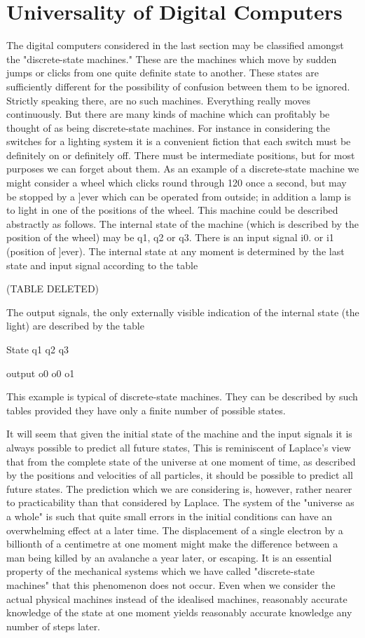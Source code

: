 \documentclass{article}
\begin{document}
\section{Universality of Digital Computers}

The digital computers considered in the last section may be classified amongst the "discrete-state machines." These are the machines which move by sudden jumps or clicks from one quite definite state to another. These states are sufficiently different for the possibility of confusion between them to be ignored. Strictly speaking there, are no such machines. Everything really moves continuously. But there are many kinds of machine which can profitably be thought of as being discrete-state machines. For instance in considering the switches for a lighting system it is a convenient fiction that each switch must be definitely on or definitely off. There must be intermediate positions, but for most purposes we can forget about them. As an example of a discrete-state machine we might consider a wheel which clicks round through 120 once a second, but may be stopped by a ]ever which can be operated from outside; in addition a lamp is to light in one of the positions of the wheel. This machine could be described abstractly as follows. The internal state of the machine (which is described by the position of the wheel) may be q1, q2 or q3. There is an input signal i0. or i1 (position of ]ever). The internal state at any moment is determined by the last state and input signal according to the table

(TABLE DELETED)

The output signals, the only externally visible indication of the internal state (the light) are described by the table

State q1 q2 q3

output o0 o0 o1

This example is typical of discrete-state machines. They can be described by such tables provided they have only a finite number of possible states.

It will seem that given the initial state of the machine and the input signals it is always possible to predict all future states, This is reminiscent of Laplace's view that from the complete state of the universe at one moment of time, as described by the positions and velocities of all particles, it should be possible to predict all future states. The prediction which we are considering is, however, rather nearer to practicability than that considered by Laplace. The system of the "universe as a whole" is such that quite small errors in the initial conditions can have an overwhelming effect at a later time. The displacement of a single electron by a billionth of a centimetre at one moment might make the difference between a man being killed by an avalanche a year later, or escaping. It is an essential property of the mechanical systems which we have called "discrete-state machines" that this phenomenon does not occur. Even when we consider the actual physical machines instead of the idealised machines, reasonably accurate knowledge of the state at one moment yields reasonably accurate knowledge any number of steps later.
\end{document}
